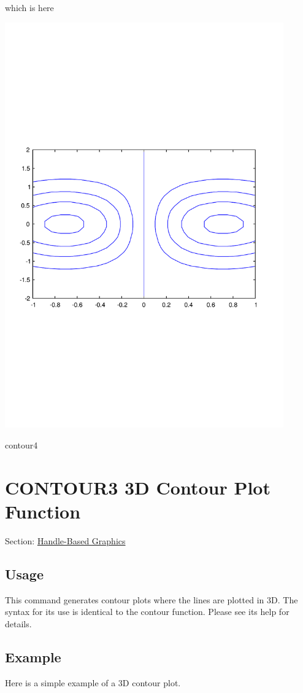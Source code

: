 which is here  
\begin{DoxyImage}
\includegraphics[width=12cm]{contour4}
\caption{contour4}
\end{DoxyImage}
 \hypertarget{handle_contour3}{}\section{C\-O\-N\-T\-O\-U\-R3 3\-D Contour Plot Function}\label{handle_contour3}
Section\-: \hyperlink{sec_handle}{Handle-\/\-Based Graphics} \hypertarget{vtkwidgets_vtkxyplotwidget_Usage}{}\subsection{Usage}\label{vtkwidgets_vtkxyplotwidget_Usage}
This command generates contour plots where the lines are plotted in 3\-D. The syntax for its use is identical to the {\ttfamily contour} function. Please see its help for details. \hypertarget{variables_struct_Example}{}\subsection{Example}\label{variables_struct_Example}
Here is a simple example of a 3\-D contour plot.


